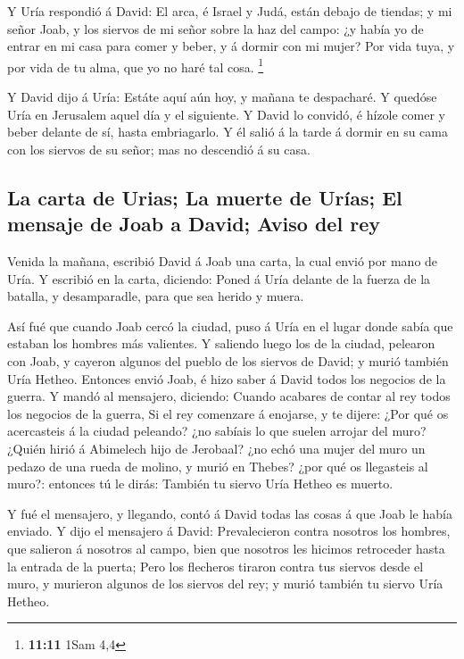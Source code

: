  Y Uría respondió á David: El arca, é Israel y Judá, están
debajo de tiendas; y mi señor Joab, y los siervos de mi señor sobre la
haz del campo: ¿y había yo de entrar en mi casa para comer y beber, y á
dormir con mi mujer? Por vida tuya, y por vida de tu alma, que yo no
haré tal cosa. \footnote{\textbf{11:11} 1Sam 4,4}

 Y David dijo á Uría: Estáte aquí aún hoy, y mañana te
despacharé. Y quedóse Uría en Jerusalem aquel día y el siguiente.
 Y David lo convidó, é hízole comer y beber delante de sí,
hasta embriagarlo. Y él salió á la tarde á dormir en su cama con los
siervos de su señor; mas no descendió á su casa.

\hypertarget{la-carta-de-urias-la-muerte-de-uruxedas-el-mensaje-de-joab-a-david-aviso-del-rey}{%
\subsection{La carta de Urias; La muerte de Urías; El mensaje de Joab a
David; Aviso del
rey}\label{la-carta-de-urias-la-muerte-de-uruxedas-el-mensaje-de-joab-a-david-aviso-del-rey}}

 Venida la mañana, escribió David á Joab una carta, la cual
envió por mano de Uría.  Y escribió en la carta, diciendo:
Poned á Uría delante de la fuerza de la batalla, y desamparadle, para
que sea herido y muera.

 Así fué que cuando Joab cercó la ciudad, puso á Uría en el
lugar donde sabía que estaban los hombres más valientes.  Y
saliendo luego los de la ciudad, pelearon con Joab, y cayeron algunos
del pueblo de los siervos de David; y murió también Uría Hetheo.
 Entonces envió Joab, é hizo saber á David todos los
negocios de la guerra.  Y mandó al mensajero, diciendo:
Cuando acabares de contar al rey todos los negocios de la guerra,
 Si el rey comenzare á enojarse, y te dijere: ¿Por qué os
acercasteis á la ciudad peleando? ¿no sabíais lo que suelen arrojar del
muro?  ¿Quién hirió á Abimelech hijo de Jerobaal? ¿no echó
una mujer del muro un pedazo de una rueda de molino, y murió en Thebes?
¿por qué os llegasteis al muro?: entonces tú le dirás: También tu siervo
Uría Hetheo es muerto.

 Y fué el mensajero, y llegando, contó á David todas las
cosas á que Joab le había enviado.  Y dijo el mensajero á
David: Prevalecieron contra nosotros los hombres, que salieron á
nosotros al campo, bien que nosotros les hicimos retroceder hasta la
entrada de la puerta;  Pero los flecheros tiraron contra
tus siervos desde el muro, y murieron algunos de los siervos del rey; y
murió también tu siervo Uría Hetheo.

